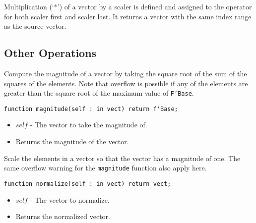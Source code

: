 \documentclass[10pt, openany]{book}
\newcommand{\function}[1]{\texttt{#1}}
\newcommand{\datatype}[1]{\texttt{#1}}
\begin{document}
Multiplication (`*') of a vector by a scaler is defined and assigned to the operator for both scaler first and scaler last.  It returns a vector with the same index range as the source vector.

\subsection{Other Operations}

Compute the magnitude of a vector by taking the square root of the sum of the squares of the elements.  Note that overflow is possible if any of the elements are greater than the square root of the maximum value of \datatype{F'Base}.
\begin{lstlisting}
function magnitude(self : in vect) return f'Base;
\end{lstlisting}
\begin{itemize}
  \item $self$ - The vector to take the magnitude of.
  \item Returns the magnitude of the vector.
\end{itemize}

Scale the elements in a vector so that the vector has a magnitude of one.  The same overflow warning for the \function{magnitude} function also apply here.
\begin{lstlisting}
function normalize(self : in vect) return vect;
\end{lstlisting}
\begin{itemize}
  \item $self$ - The vector to normalize.
  \item Returns the normalized vector.
\end{itemize}

\clearpage
{}
\nocite{NA3rd}


\end{document}
